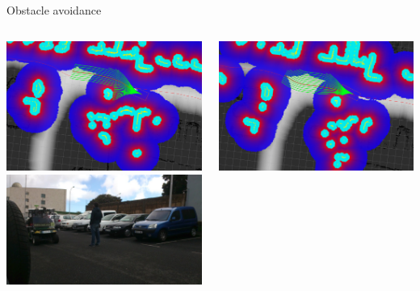 \begin{frame}[plain]{Obstacle avoidance}
  \begin{columns}
    \begin{center}
      \includegraphics[width=\textwidth]{example10}\\
      \includegraphics[width=\textwidth]{seq10}
    \end{center}
    \begin{center}
      \includegraphics[width=\textwidth]{example11}\\

\end{center}
\end{columns}
\end{frame}
